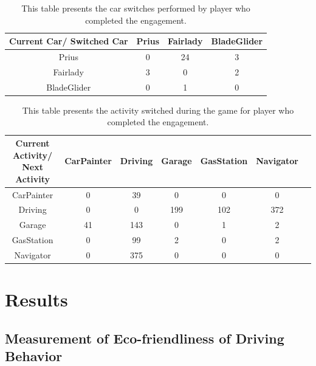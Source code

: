 \documentclass[preprint,authoryear,12pt]{elsarticle}
\begin{document}
\begin{table}[!htb]
	\renewcommand*{\arraystretch}{1.4}
	\caption{This table presents the car switches performed by player who completed the engagement.}
	\begin{center}
		\begin{tabular}{c|c|c|c}
			Current Car/ Switched Car & Prius & Fairlady & BladeGlider \\
			\hline
			Prius &	 0
			& 24  & 3  \\
			
			Fairlady & 3
			& 0  &  2 \\
			
			BladeGlider &	 0
			& 1  &  0  \\
		
		\end{tabular}
	\end{center}
	\label{T:Carswitch}
\end{table}


\begin{table}[!htb]
	\renewcommand*{\arraystretch}{1.4}
	\caption{This table presents the activity switched during the game for player who completed the engagement.}
	\begin{center}
		\begin{tabular}{c|c|c|c|c|c|c}
			Current Activity/ Next Activity & CarPainter & Driving & Garage & GasStation &  Navigator\\
			\hline
			CarPainter &	0&	39&	0&	0&	0\\
			
			Driving & 0	 & 0&	199&	102&	372\\
			
			Garage& 41&	143&	0&	1&	2 \\
			
			GasStation& 	0&	99&	2&	0&	2 \\
			
			Navigator& 0&	375&	0&	0&	0 \\
			
		\end{tabular}
	\end{center}
	\label{T:Activityswitch}
\end{table}



\section{Results}
\label{sec:result}

\subsection{Measurement of Eco-friendliness of Driving Behavior}
\label{sec:measureEco}
\end{document}
